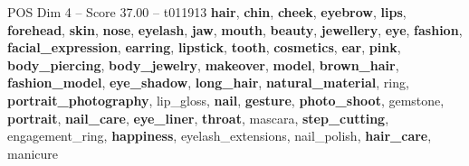 \begin{textsample}{POS Dim 4 – Score 37.00 – t011913}  \label{ex:f4_pos_001}
\textbf{hair}, \textbf{chin}, \textbf{cheek}, \textbf{eyebrow}, \textbf{lips}, \textbf{forehead}, \textbf{skin}, \textbf{nose}, \textbf{eyelash}, \textbf{jaw}, \textbf{mouth}, \textbf{beauty}, \textbf{jewellery}, \textbf{eye}, \textbf{fashion}, \textbf{facial\_expression}, \textbf{earring}, \textbf{lipstick}, \textbf{tooth}, \textbf{cosmetics}, \textbf{ear}, \textbf{pink}, \textbf{body\_piercing}, \textbf{body\_jewelry}, \textbf{makeover}, \textbf{model}, \textbf{brown\_hair}, \textbf{fashion\_model}, \textbf{eye\_shadow}, \textbf{long\_hair}, \textbf{natural\_material}, ring, \textbf{portrait\_photography}, lip\_gloss, \textbf{nail}, \textbf{gesture}, \textbf{photo\_shoot}, gemstone, \textbf{portrait}, \textbf{nail\_care}, \textbf{eye\_liner}, \textbf{throat}, mascara, \textbf{step\_cutting}, engagement\_ring, \textbf{happiness}, eyelash\_extensions, nail\_polish, \textbf{hair\_care}, manicure

\end{textsample}

